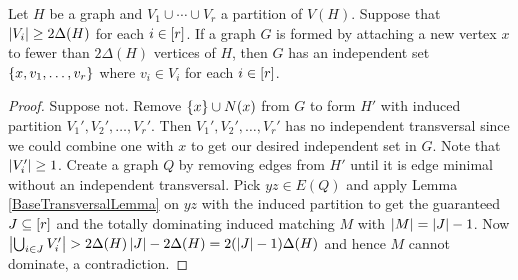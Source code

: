\begin{lem}\label{SingletonSetTransversal}
Let $H$ be a graph and $V_1 \cup \cdots \cup V_r$ a partition of $V(H)$. 
Suppose that $\left|V_i\right| \geq 2\Delta(H)$ for each $i \in \left[r\right]$.  If a
graph $G$ is formed by attaching a new vertex $x$ to fewer than $2\Delta(H)$
vertices of $H$,  then $G$ has an independent set $\left\{ x, v_1, \ldots, v_r \right\}$
where $v_i \in V_i$ for each $i \in \left[r\right]$.
\end{lem}
\begin{proof}
Suppose not. Remove $\left\{ x \right\} \cup N(x)$ from $G$ to form $H'$ with induced
partition $V_1', V_2', \ldots, V_r'$. Then $V_1', V_2', \ldots, V_r'$ has no
independent transversal since we could combine one with $x$ to get our desired
independent set in $G$. Note that $\left|V_i'\right| \geq 1$. 
Create a graph $Q$ by removing edges from $H'$ until it is edge minimal without
an independent transversal. Pick $yz \in E(Q)$ and apply Lemma
\ref{BaseTransversalLemma} on $yz$ with the induced partition to get the guaranteed 
$J \subseteq \left[r\right]$ and the totally dominating induced matching 
$M$ with $\left|M\right| = \left|J\right| - 1$. 
Now $\left|\bigcup_{i \in J} V_i'\right| > 2\Delta(H)\left|J\right| - 2\Delta(H) =
2(\left|J\right| - 1)\Delta(H)$ and hence $M$ cannot dominate, a contradiction.
\end{proof}


